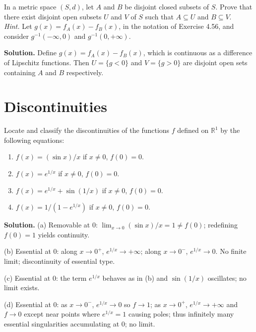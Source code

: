 \begin{problembox}
In a metric space $(S, d)$, let $A$ and $B$ be disjoint closed subsets of $S$. Prove that there exist disjoint open subsets $U$ and $V$ of $S$ such that $A \subseteq U$ and $B \subseteq V$. \\
\textit{Hint.} Let $g(x) = f_A(x) - f_B(x)$, in the notation of Exercise 4.56, and consider $g^{-1}(-\infty, 0)$ and $g^{-1}(0, +\infty)$.
\end{problembox}

\noindent\textbf{Solution.}
Define $g(x)=f_A(x)-f_B(x)$, which is continuous as a difference of Lipschitz functions. Then $U=\{g<0\}$ and $V=\{g>0\}$ are disjoint open sets containing $A$ and $B$ respectively.
\medskip

\section{Discontinuities}

\begin{problembox}
Locate and classify the discontinuities of the functions $f$ defined on $\mathbb{R}^1$ by the following equations:
\begin{enumerate}[label=(\alph*)]
\item $f(x) = (\sin x)/x$ if $x \neq 0$, $f(0) = 0$.
\item $f(x) = e^{1/x}$ if $x \neq 0$, $f(0) = 0$.
\item $f(x) = e^{1/x} + \sin(1/x)$ if $x \neq 0$, $f(0) = 0$.
\item $f(x) = 1/(1 - e^{1/x})$ if $x \neq 0$, $f(0) = 0$.
\end{enumerate}
\end{problembox}

\noindent\textbf{Solution.}
(a) Removable at $0$: $\lim_{x\to0}(\sin x)/x=1\ne f(0)$; redefining $f(0)=1$ yields continuity.

(b) Essential at $0$: along $x\to 0^+$, $e^{1/x}\to+\infty$; along $x\to0^-$, $e^{1/x}\to 0$. No finite limit; discontinuity of essential type.

(c) Essential at $0$: the term $e^{1/x}$ behaves as in (b) and $\sin(1/x)$ oscillates; no limit exists.

(d) Essential at $0$: as $x\to0^-$, $e^{1/x}\to0$ so $f\to 1$; as $x\to0^+$, $e^{1/x}\to+\infty$ and $f\to 0$ except near points where $e^{1/x}=1$ causing poles; thus infinitely many essential singularities accumulating at $0$; no limit.
\medskip

